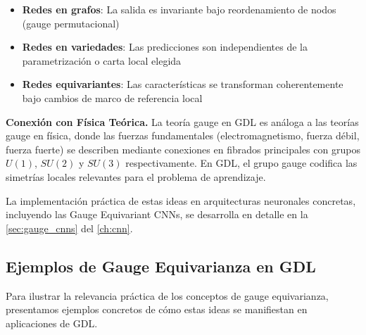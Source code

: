 \begin{itemize}
    \item \textbf{Redes en grafos}: La salida es invariante bajo reordenamiento de nodos (gauge permutacional)
    \item \textbf{Redes en variedades}: Las predicciones son independientes de la parametrización o carta local elegida
    \item \textbf{Redes equivariantes}: Las características se transforman coherentemente bajo cambios de marco de referencia local
\end{itemize}

\textbf{Conexión con Física Teórica.} La teoría gauge en \gls{GDL} es análoga a las teorías gauge en física, donde las fuerzas fundamentales (electromagnetismo, fuerza débil, fuerza fuerte) se describen mediante conexiones en fibrados principales con grupos $U(1)$, $SU(2)$ y $SU(3)$ respectivamente. En \gls{GDL}, el grupo gauge codifica las simetrías locales relevantes para el problema de aprendizaje.

La implementación práctica de estas ideas en arquitecturas neuronales concretas, incluyendo las Gauge Equivariant CNNs, se desarrolla en detalle en la \autoref{sec:gauge_cnns} del \autoref{ch:cnn}.

\subsection{Ejemplos de Gauge Equivarianza en GDL}\label{subsec:ejemplos_gauge_gdl}

Para ilustrar la relevancia práctica de los conceptos de gauge equivarianza, presentamos ejemplos concretos de cómo estas ideas se manifiestan en aplicaciones de \gls{GDL}.

